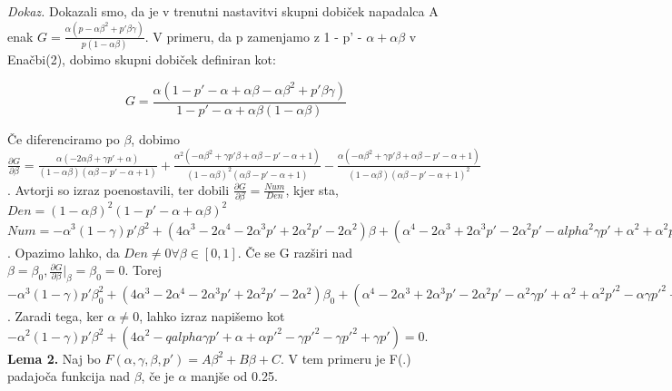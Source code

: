\documentclass{acm_proc_article-sp}
\begin{document}
\textit{Dokaz.} Dokazali smo, da je v trenutni nastavitvi skupni dobiček napadalca A enak $G = \frac{\alpha(p - \alpha\beta^2 + p'\beta\gamma)}{p(1 - \alpha\beta)}$. V primeru, da p zamenjamo z 1 - p' - $\alpha + \alpha\beta$ v Enačbi(2), dobimo skupni dobiček definiran kot:

\begin{equation}
G = \frac{\alpha(1 - p' - \alpha + \alpha\beta - \alpha\beta^2 + p' \beta\gamma)}{1 - p' - \alpha + \alpha\beta(1 - \alpha\beta)}
\end{equation}

Če diferenciramo po $\beta$, dobimo
$\frac{\partial G}{\partial\beta} = \frac{\alpha(-2\alpha\beta + \gamma p' + \alpha)}{(1 - \alpha\beta)(\alpha\beta - p' - \alpha + 1)} + \frac{\alpha^2(-\alpha\beta^2 + \gamma p'\beta + \alpha\beta - p' - \alpha + 1)}{(1 - \alpha\beta)^2(\alpha\beta - p' - \alpha + 1)} - \frac{\alpha(-\alpha\beta^2 + \gamma p'\beta + \alpha\beta - p' - \alpha + 1)}{(1 - \alpha\beta)(\alpha\beta - p' - \alpha + 1)^2}$. Avtorji so izraz poenostavili, ter dobili $\frac{\partial G}{\partial\beta} = \frac{Num}{Den}$, kjer sta, 
\newline
$Den = (1 - \alpha\beta)^2(1 - p' - \alpha + \alpha\beta)^2$
\newline
$Num = -\alpha^3(1 - \gamma)p'\beta^2 + (4\alpha^3 - 2 \alpha^4 - 2\alpha^3 p' + 2\alpha^2 p' - 2\alpha^2)\beta + (\alpha^4 - 2\alpha^3 + 2\alpha^3 p' - 2\alpha^2 p' - alpha^2\gamma p' + \alpha^2 + \alpha^2 p'^2 - \alpha\gamma p'^2 + \alpha\gamma p')$.
\newline
\newline
Opazimo lahko, da $Den \not= 0 \forall\beta \in [0, 1].$ Če se G razširi nad $\beta = \beta_0, \frac{\partial G}{\partial\beta}|_\beta=\beta_0 = 0$. Torej $-\alpha^3(1-\gamma)p' \beta_0^2 + (4\alpha^3 - 2\alpha^4 - 2\alpha^3 p' + 2\alpha^2 p' - 2\alpha^2)\beta_0 + (\alpha^4 - 2\alpha^3 + 2\alpha^3 p' - 2\alpha^2 p' - \alpha^2 \gamma p' + \alpha^2 + \alpha^2 p'^2 - \alpha\gamma p'^2 + \alpha\gamma p') = 0$. Zaradi tega, ker $\alpha \not= 0$, lahko izraz napišemo kot $-\alpha^2(1 - \gamma)p' \beta^2 + (4\alpha^2 - qalpha\gamma p' + \alpha + \alpha p'^2 - \gamma p'^2 - \gamma p'^2 + \gamma p') = 0$. 
\newline
\newline
\textbf{Lema 2.} Naj bo $ F(\alpha, \gamma, \beta, p') = A\beta^2 + B\beta + C $. V tem primeru je F(.) padajoča funkcija nad $ \beta $, če je $ \alpha $ manjše od 0.25.
\end{document}
